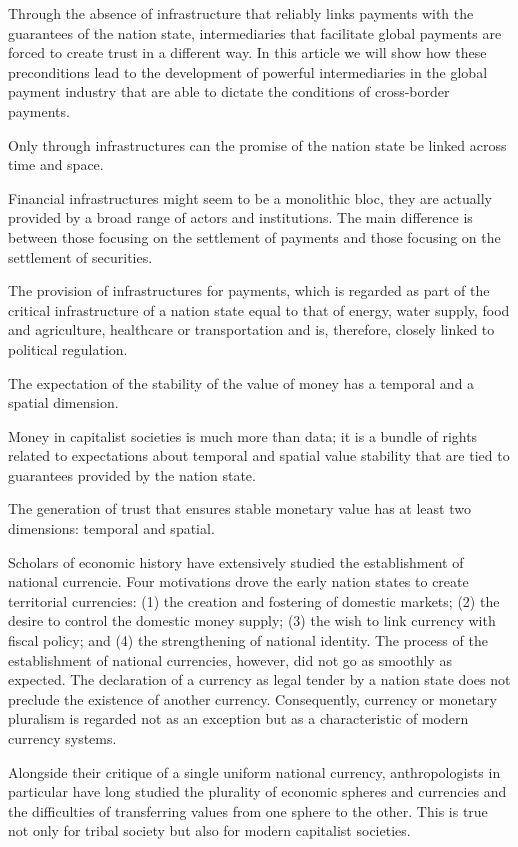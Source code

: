 \documentclass[
]{book}
\begin{document}
Through the absence of infrastructure that reliably links payments with the guarantees of the nation state, intermediaries that facilitate global payments are forced to create trust in a different way. In this article we will show how these preconditions lead to the development of powerful intermediaries in the global payment industry that are able to dictate the conditions of cross-border payments.

Only through infrastructures can the promise of the nation state be linked across time and space.

Financial infrastructures might seem to be a monolithic bloc, they are actually provided by a broad range of actors and institutions. The main difference is between those focusing on the settlement of payments and those focusing on the settlement of securities.

The provision of infrastructures for payments, which is regarded as part of the critical infrastructure of a nation state equal to that of energy, water supply, food and agriculture, healthcare or transportation and is, therefore, closely linked to political regulation.

The expectation of the stability of the value of money has a temporal and a spatial dimension.

Money in capitalist societies is much more than data; it is a bundle of rights related to expectations about temporal and spatial value stability that are tied to guarantees provided by the nation state.

The generation of trust that ensures stable monetary value has at least two dimensions: temporal and spatial.

Scholars of economic history have extensively studied the establishment of national currencie. Four motivations drove the early nation states to create territorial currencies: (1) the creation and fostering of domestic markets; (2) the desire to control the domestic money supply; (3) the wish to link currency with fiscal policy; and (4) the strengthening of national identity. The process of the establishment of national currencies, however, did not go as smoothly as expected. The declaration of a currency as legal tender by a nation state does not preclude the existence of another currency. Consequently, currency or monetary pluralism is regarded not as an exception but as a characteristic of modern currency systems.

Alongside their critique of a single uniform national currency, anthropologists in particular have long studied the plurality of economic spheres and currencies and the difficulties of transferring values from one sphere to the other.
This is true not only for tribal society but also for modern capitalist societies.
\end{document}
